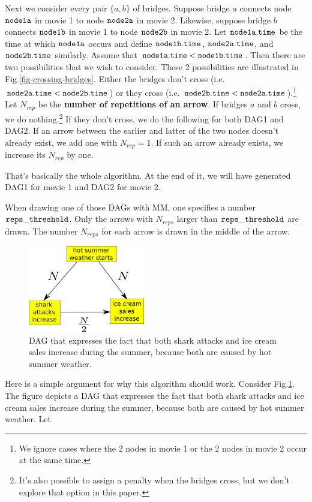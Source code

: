 \documentclass[12pt]{article}
\begin{document}
Next we consider every  pair $\{a,b\}$
of bridges. Suppose bridge  $a$ 
connects node $\tt node1a$ in movie 1
to node $\tt node2a$ in movie 2.
Likewise, suppose bridge $b$ connects
$\tt node1b$ in movie 1 to
node $\tt node2b$ in movie 2.
Let $\tt node1a.time$ be the time at which 
$\tt node1a$ occurs and define
$\tt node1b.time$,
$\tt node2a.time$, and
$\tt node2b.time$ similarly.
Assume that
$\tt
node1a.time< node1b.time$.
Then there are two possibilities
that we wish to consider. These 2 possibilities are illustrated in Fig.\ref{fig-crossing-bridges}.
Either the bridges don't cross 
(i.e. $\tt node2a.time < node2b.time$)
or they cross (i.e. $\tt node2b.time < node2a.time$).\footnote{We ignore cases
where the 2 nodes in movie 1 or the 
2 nodes in movie 2 occur at the same time.}
Let $N_{rep}$ be the {\bf number
of repetitions of an arrow}.
If bridges $a$ and $b$ cross,
we do nothing.\footnote{It's also 
possible to assign a penalty
when the bridges cross,
but we don't explore that option in this paper.} If they don't cross,
we do the following for both DAG1 and DAG2.
If an arrow between the earlier and latter of the two nodes doesn't already
exist, we add one with $N_{rep}=1$.
If such an arrow already exists,
we increase its $N_{rep}$ by one.

That's basically the whole algorithm.
At the end of it, we will have
generated DAG1 for movie 1 and DAG2 for movie 2.

When drawing one of those DAGs with MM,
one specifies a number $\tt reps\_threshold$.
Only the arrows with $N_{reps}$
larger than $\tt reps\_threshold$
are drawn.
The number $N_{reps}$ for each arrow is drawn
in the middle of the arrow.



\begin{figure}[h!]
\centering
\includegraphics[width=2in]
{shark-attacks.png}
\caption{
DAG that expresses the fact that both
shark attacks and ice
cream sales increase during the summer,
because both are caused by hot summer weather.
}
\label{fig-shark-attacks}
\end{figure}

Here is a simple argument for
why this algorithm should work.
Consider Fig.\ref{fig-shark-attacks}.
The figure depicts a DAG that
expresses the fact that both
shark attacks and ice
cream sales increase during the summer,
because both are caused by hot summer weather.
Let 
\end{document}
